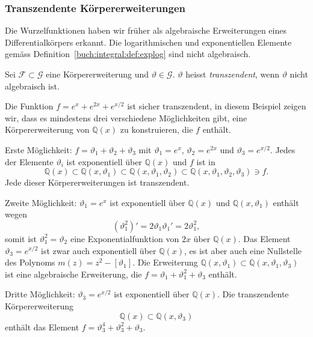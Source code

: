 %
%
%
\subsubsection{Transzendente Körpererweiterungen}
Die Wurzelfunktionen haben wir früher als algebraische Erweiterungen
eines Differentialkörpers erkannt.
Die logarithmischen und exponentiellen Elemente gemäss
Definition~\ref{buch:integral:def:explog} sind nicht algebraisch.

\begin{definition}
\label{buch:integral:def:transzendent}
Sei $\mathscr{F}\subset\mathscr{G}$ eine Körpererweiterung und
$\vartheta\in\mathscr{G}$.
$\vartheta$ heisst {\em transzendent}, wenn $\vartheta$ nicht
algebraisch ist.
\end{definition}

\begin{beispiel}
Die Funktion $f = e^x + e^{2x} + e^{x/2}$ ist sicher transzendent,
in diesem Beispiel zeigen wir, dass es mindestens drei verschiedene
Möglichkeiten gibt, eine Körpererweiterung von $\mathbb{Q}(x)$ zu
konstruieren, die $f$ enthält.

Erste Möglichkeit: $f=\vartheta_1 + \vartheta_2 + \vartheta_3$ mit
$\vartheta_1=e^x$,
$\vartheta_2=e^{2x}$
und
$\vartheta_3=e^{x/2}$.
Jedes der Elemente $\vartheta_i$ ist exponentiell über $\mathbb{Q}(x)$ und 
$f$ ist in
\[
\mathbb{Q}(x)
\subset
\mathbb{Q}(x,\vartheta_1)
\subset
\mathbb{Q}(x,\vartheta_1,\vartheta_2)
\subset
\mathbb{Q}(x,\vartheta_1,\vartheta_2,\vartheta_3)
\ni
f.
\]
Jede dieser Körpererweiterungen ist transzendent.

Zweite Möglichkeit: $\vartheta_1=e^x$ ist exponentiell über 
$\mathbb{Q}(x)$ und $\mathbb{Q}(x,\vartheta_1)$ enthält wegen
\[
(\vartheta_1^2)'
=
2\vartheta_1\vartheta_1'
=
2\vartheta_1^2,
\]
somit ist $\vartheta_1^2=\vartheta_2$ eine Exponentialfunktion von $2x$
über $\mathbb{Q}(x)$.
Das Element $\vartheta_3=e^{x/2}$ ist zwar auch exponentiell über
$\mathbb{Q}(x)$, es ist aber auch eine Nullstelle des Polynoms
$m(z)=z^2-[\vartheta_1]$.
Die Erweiterung
$\mathbb{Q}(x,\vartheta_1)\subset\mathbb{Q}(x,\vartheta_1,\vartheta_3)$
ist eine algebraische Erweiterung, die
$f=\vartheta_1 + \vartheta_1^2+\vartheta_3$ enthält.

Dritte Möglichkeit: $\vartheta_3=e^{x/2}$ ist exponentiell über
$\mathbb{Q}(x)$.
Die transzendente Körpererweiterung
\[
\mathbb{Q}(x) \subset \mathbb{Q}(x,\vartheta_3)
\]
enthält das Element
$f=\vartheta_3^4+\vartheta_3^2 + \vartheta_3 $.
\end{beispiel}

